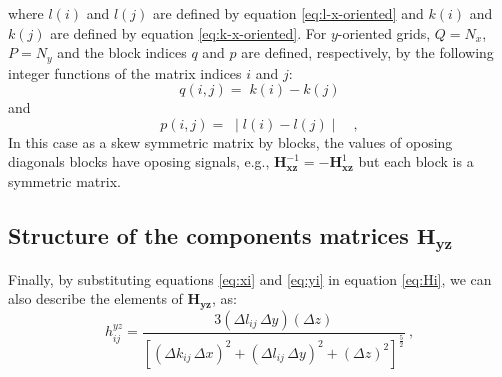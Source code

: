 where $l(i)$ and $l(j)$ are defined by equation \ref{eq:l-x-oriented} 
and $k(i)$ and $k(j)$ are defined by equation \ref{eq:k-x-oriented}.
For $y$-oriented grids, $Q = N_{x}$, $P = N_{y}$ and the block indices
$q$ and $p$ are defined, respectively, by the following integer functions 
of the matrix indices $i$ and $j$:
\begin{equation}
	q(i, j) = \;  k(i) - k(j)  
	\label{eq:Hxz-q-y-oriented}
\end{equation}
and
\begin{equation}
	p(i, j) = \; \mid l(i) - l(j) \mid \quad ,
	\label{eq:Hxz-p-y-oriented}
\end{equation}
In this case as a skew symmetric matrix by blocks, the values of oposing diagonals blocks have oposing signals, e.g., $\mathbf{H}^{-1}_\mathbf{xz} = -\mathbf{H}^{1}_\mathbf{xz}$ but each block is a symmetric matrix.

\subsection{Structure of the components matrices $\mathbf{H_{yz}}$}

Finally, by substituting equations \ref{eq:xi} and \ref{eq:yi} in equation \ref{eq:Hi}, we can also describe the elements of $\mathbf{H_{yz}}$, as:
\begin{equation}
	h^{yz}_{ij} = \frac{3 (\Delta l_{ij} \, \Delta y )(\Delta z)}{\left[ 
		\left( \Delta k_{ij} \, \Delta x \right)^{2} + 
		\left( \Delta l_{ij} \, \Delta y \right)^{2} + 
		\left( \Delta z \right)^{2} \right]^{\frac{5}{2}}} \: ,
	\label{eq:hyz_mag}
\end{equation}

